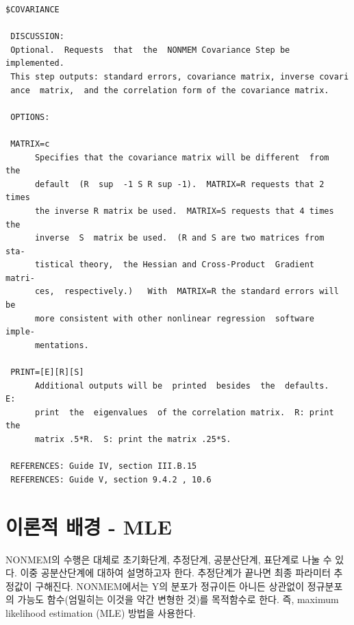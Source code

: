 \documentclass[
  10pt,
  krantz2,
  a4paper]{krantz}
\theoremstyle{definition}
\theoremstyle{definition}
\theoremstyle{definition}
\theoremstyle{remark}
\begin{document}
\begin{verbatim}
$COVARIANCE

 DISCUSSION:
 Optional.  Requests  that  the  NONMEM Covariance Step be implemented.
 This step outputs: standard errors, covariance matrix, inverse covari
 ance  matrix,  and the correlation form of the covariance matrix.

 OPTIONS:

 MATRIX=c
      Specifies that the covariance matrix will be different  from  the
      default  (R  sup  -1 S R sup -1).  MATRIX=R requests that 2 times
      the inverse R matrix be used.  MATRIX=S requests that 4 times the
      inverse  S  matrix be used.  (R and S are two matrices from  sta-
      tistical theory,  the Hessian and Cross-Product  Gradient  matri-
      ces,  respectively.)   With  MATRIX=R the standard errors will be
      more consistent with other nonlinear regression  software  imple-
      mentations.

 PRINT=[E][R][S]
      Additional outputs will be  printed  besides  the  defaults.   E:
      print  the  eigenvalues  of the correlation matrix.  R: print the
      matrix .5*R.  S: print the matrix .25*S.

 REFERENCES: Guide IV, section III.B.15
 REFERENCES: Guide V, section 9.4.2 , 10.6
\end{verbatim}


\hypertarget{uxc774uxb860uxc801-uxbc30uxacbd---mle}{%
\section{이론적 배경 - MLE}\label{uxc774uxb860uxc801-uxbc30uxacbd---mle}}


NONMEM의 수행은 대체로 초기화단계, 추정단계, 공분산단계, 표단계로 나눌 수 있다. 이중 공분산단계에 대하여 설명하고자 한다. 추정단계가 끝나면 최종 파라미터 추정값이 구해진다. NONMEM에서는 Y의 분포가 정규이든 아니든 상관없이 정규분포의 가능도 함수(엄밀히는 이것을 약간 변형한 것)를 목적함수로 한다. 즉, maximum likelihood estimation (MLE) 방법을 사용한다.
\end{document}
